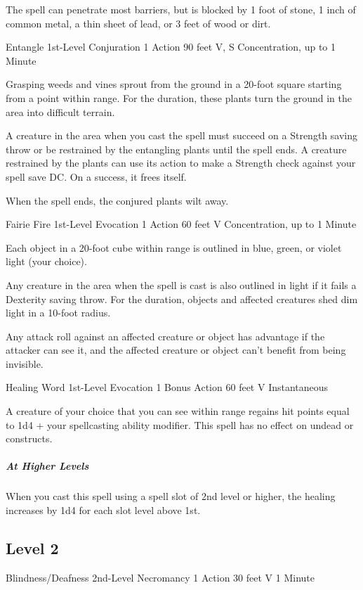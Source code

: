 {The spell can penetrate most barriers, but is blocked by 1 foot of stone, 1 inch of common metal, a thin sheet of lead, or 3 feet of wood or dirt.

\DndSpellHeader
  {Entangle}
  {1st-Level Conjuration}
  {1 Action}
  {90 feet}
  {V, S}
  {Concentration, up to 1 Minute}

Grasping weeds and vines sprout from the ground in a 20-foot square starting from a point within range. For the duration, these plants turn the ground in the area into difficult terrain.

A creature in the area when you cast the spell must succeed on a Strength saving throw or be restrained by the entangling plants until the spell ends. A creature restrained by the plants can use its action to make a Strength check against your spell save DC. On a success, it frees itself.

When the spell ends, the conjured plants wilt away.

\DndSpellHeader
  {Fairie Fire}
  {1st-Level Evocation}
  {1 Action}
  {60 feet}
  {V}
  {Concentration, up to 1 Minute}

Each object in a 20-foot cube within range is outlined in blue, green, or violet light (your choice).

Any creature in the area when the spell is cast is also outlined in light if it fails a Dexterity saving throw. For the duration, objects and affected creatures shed dim light in a 10-foot radius.

Any attack roll against an affected creature or object has advantage if the attacker can see it, and the affected creature or object can’t benefit from being invisible.

\DndSpellHeader
  {Healing Word}
  {1st-Level Evocation}
  {1 Bonus Action}
  {60 feet}
  {V}
  {Instantaneous}

A creature of your choice that you can see within range regains hit points equal to 1d4 + your spellcasting ability modifier. This spell has no effect on undead or constructs.

\subparagraph*{At Higher Levels} When you cast this spell using a spell slot of 2nd level or higher, the healing increases by 1d4 for each slot level above 1st.

\subsection*{Level 2}

\DndSpellHeader
  {Blindness/Deafness}
  {2nd-Level Necromancy}
  {1 Action}
  {30 feet}
  {V}
  {1 Minute}

}
